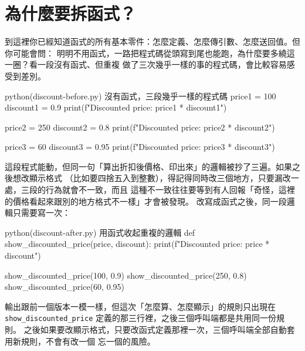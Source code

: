 \section{為什麼要拆函式？}
\label{sec:function-why}

到這裡你已經知道函式的所有基本零件：怎麼定義、怎麼傳引數、怎麼送回值。但你可能會問：
明明不用函式，一路把程式碼從頭寫到尾也能跑，為什麼要多繞這一圈？看一段沒有函式、但重複
做了三次幾乎一樣的事的程式碼，會比較容易感受到差別。

\begin{example}{python}{(discount-before.py) 沒有函式，三段幾乎一樣的程式碼}
price1 = 100
discount1 = 0.9
print(f"Discounted price: {price1 * discount1}")

price2 = 250
discount2 = 0.8
print(f"Discounted price: {price2 * discount2}")

price3 = 60
discount3 = 0.95
print(f"Discounted price: {price3 * discount3}")
\end{example}


這段程式能動，但同一句「算出折扣後價格、印出來」的邏輯被抄了三遍。如果之後想改顯示格式
（比如要四捨五入到整數），得記得同時改三個地方，只要漏改一處，三段的行為就會不一致，而且
這種不一致往往要等到有人回報「奇怪，這裡的價格看起來跟別的地方格式不一樣」才會被發現。
改寫成函式之後，同一段邏輯只需要寫一次：

\begin{example}{python}{(discount-after.py) 用函式收起重複的邏輯}
def show_discounted_price(price, discount):
    print(f"Discounted price: {price * discount}")


show_discounted_price(100, 0.9)
show_discounted_price(250, 0.8)
show_discounted_price(60, 0.95)
\end{example}


輸出跟前一個版本一模一樣，但這次「怎麼算、怎麼顯示」的規則只出現在
\texttt{show\_discounted\_price} 定義的那三行裡，之後三個呼叫端都是共用同一份規則。
之後如果要改顯示格式，只要改函式定義那裡一次，三個呼叫端全部自動套用新規則，不會有改一個
忘一個的風險。

